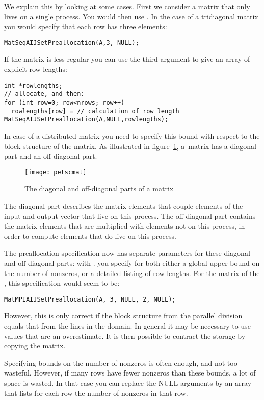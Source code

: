 We explain this by looking at some cases. First we consider a matrix
that only lives on a single process. You would then use
.  In
the case of a tridiagonal matrix you would specify that each row has
three elements:
%
\begin{lstlisting}
MatSeqAIJSetPreallocation(A,3, NULL);
\end{lstlisting}

If the matrix is less regular you can use the third argument to give
an array of explicit row lengths:
\begin{lstlisting}
int *rowlengths;
// allocate, and then:
for (int row=0; row<nrows; row++)
  rowlengths[row] = // calculation of row length
MatSeqAIJSetPreallocation(A,NULL,rowlengths);
\end{lstlisting}

In case of a distributed matrix you need to specify this bound with
respect to the block structure of the matrix. As illustrated in figure~\ref{fig:petscmat},
a~matrix has a diagonal part and an off-diagonal part.
%
\begin{figure}[ht]
  \texttt{[image: petscmat]}
  \caption{The diagonal and off-diagonal parts of a matrix}
  \label{fig:petscmat}
\end{figure}
%
The diagonal part describes the matrix elements that couple elements of the
input and output vector that live on this process. The off-diagonal part contains the
matrix elements that are multiplied with elements not on this process, in order to compute
elements that do live on this process.

The preallocation specification now has separate parameters for
these diagonal and off-diagonal parts:
with 
.
you specify for both either a global upper bound on the number of nonzeros,
or a detailed listing of row lengths.
For the matrix of the , this specification
would seem to be:
\begin{lstlisting}
MatMPIAIJSetPreallocation(A, 3, NULL, 2, NULL);
\end{lstlisting}
However, this is only correct if the block structure from the parallel division
equals that from the lines in the domain.
In general it may be necessary to use values that are an overestimate.
It is then possible to contract the storage by copying the matrix.

Specifying bounds on the number of nonzeros is often enough, and not too wasteful. However,
if many rows have fewer nonzeros than these bounds, a lot of space is
wasted. In that case you can replace the NULL arguments by an array
that lists for each row the number of nonzeros in that row.


